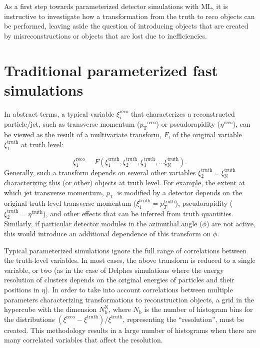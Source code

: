 \documentclass[showpacs,showkeys,preprint,prd,nofootinbib,linenumbers,12pt,superscriptaddress]{revtex4-1}
\def\pt{\ensuremath{p_{\mathrm{T}}}}
\def\genRes{\ensuremath{(\xi^{\mathrm{reco}}-\xi^{\mathrm{truth}})/\xi^{\mathrm{truth}}}}
\begin{document}
As a first step towards parameterized detector simulations with ML, it is instructive to investigate how a transformation from the truth to reco objects can be performed, leaving aside the question of introducing objects that are created by misreconstructions or objects that are lost due to inefficiencies.

\section{Traditional parameterized fast simulations}

In abstract terms, a typical variable $\xi_i^{\mathrm{reco}}$ that characterizes a reconstructed particle/jet, such as transverse momentum (\pt$^{\mathrm{reco}}$) or pseudorapidity ($\eta^{\mathrm{reco}}$), can be viewed as the result of a multivariate transform, $F$, of the original variable $\xi_1^{\mathrm{truth}}$ at truth level:

$$
\xi_1^{\mathrm{reco}} = F (\xi_1^{\mathrm{truth}}, \xi_2^{\mathrm{truth}}, \xi_3^{\mathrm{truth}}, ...\xi_{\mathrm{N}}^{\mathrm{truth}}).
$$
Generally, such a transform  depends on several other variables $\xi_2^{\mathrm{truth}}$ ..  $\xi_{\mathrm{N}}^{\mathrm{truth}}$ characterizing this (or other) objects at truth level. For example, the extent at which jet transverse momentum, \pt\ is modified by a detector depends on the original truth-level transverse momentum ($\xi_1^{\mathrm{truth}}=p_T^{\mathrm{truth}}$), pseudorapidity ($\xi_2^{\mathrm{truth}}=\eta^{\mathrm{truth}}$), and other effects that can be inferred from truth quantities. Similarly, if particular detector modules in the azimuthal angle ($\phi$) are not active, this would introduce an additional dependence of this transform on $\phi$.

Typical parameterized simulations ignore the full range of correlations between the truth-level variables. In most cases, the above transform is reduced to a single variable, or two (as in the case of Delphes simulations where the energy resolution of clusters depends on the original energies of particles and their positions in $\eta$). In order to take into account correlations between multiple parameters characterizing transformations to reconstruction objects, a grid in the hypercube with the dimension $N_{\mathrm{b}}^{\mathrm{N}}$, where $N_{\mathrm{b}}$ is the number of histogram bins for the distributions \genRes, representing the ``resolution'', must be created. This methodology results in a large number of histograms when there are many correlated variables that affect the resolution.
\end{document}
